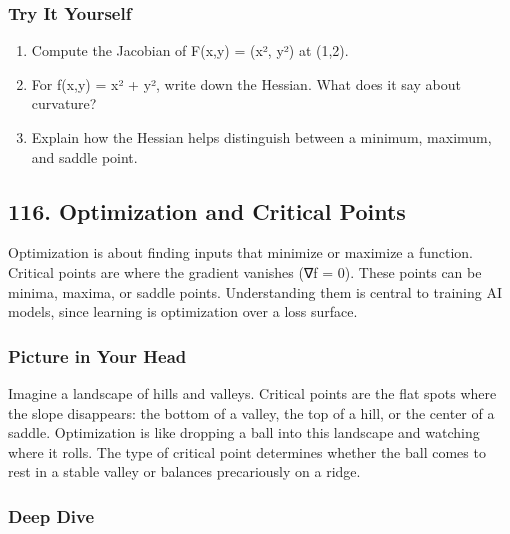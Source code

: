 \documentclass[
  letterpaper,
  DIV=11,
  numbers=noendperiod]{scrreprt}
\providecommand{\tightlist}{%
  \setlength{\itemsep}{0pt}\setlength{\parskip}{0pt}}
\begin{document}
\subsubsection{Try It Yourself}\label{try-it-yourself-114}

\begin{enumerate}
\def\labelenumi{\arabic{enumi}.}
\tightlist
\item
  Compute the Jacobian of F(x,y) = (x², y²) at (1,2).
\item
  For f(x,y) = x² + y², write down the Hessian. What does it say about
  curvature?
\item
  Explain how the Hessian helps distinguish between a minimum, maximum,
  and saddle point.
\end{enumerate}

\subsection{116. Optimization and Critical
Points}\label{optimization-and-critical-points}

Optimization is about finding inputs that minimize or maximize a
function. Critical points are where the gradient vanishes (∇f = 0).
These points can be minima, maxima, or saddle points. Understanding them
is central to training AI models, since learning is optimization over a
loss surface.

\subsubsection{Picture in Your Head}\label{picture-in-your-head-115}

Imagine a landscape of hills and valleys. Critical points are the flat
spots where the slope disappears: the bottom of a valley, the top of a
hill, or the center of a saddle. Optimization is like dropping a ball
into this landscape and watching where it rolls. The type of critical
point determines whether the ball comes to rest in a stable valley or
balances precariously on a ridge.

\subsubsection{Deep Dive}\label{deep-dive-115}
\end{document}
